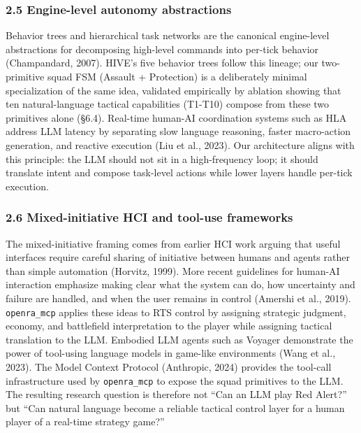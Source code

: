 \documentclass[
  journal]{IEEEtran}
\begin{document}
\subsubsection{2.5 Engine-level autonomy
abstractions}\label{engine-level-autonomy-abstractions}

Behavior trees and hierarchical task networks are the canonical
engine-level abstractions for decomposing high-level commands into
per-tick behavior (Champandard, 2007). HIVE's five behavior trees follow
this lineage; our two-primitive squad FSM (Assault + Protection) is a
deliberately minimal specialization of the same idea, validated
empirically by ablation showing that ten natural-language tactical
capabilities (T1-T10) compose from these two primitives alone (§6.4).
Real-time human-AI coordination systems such as HLA address LLM latency
by separating slow language reasoning, faster macro-action generation,
and reactive execution (Liu et al., 2023). Our architecture aligns with
this principle: the LLM should not sit in a high-frequency loop; it
should translate intent and compose task-level actions while lower
layers handle per-tick execution.

\subsubsection{2.6 Mixed-initiative HCI and tool-use
frameworks}\label{mixed-initiative-hci-and-tool-use-frameworks}

The mixed-initiative framing comes from earlier HCI work arguing that
useful interfaces require careful sharing of initiative between humans
and agents rather than simple automation (Horvitz, 1999). More recent
guidelines for human-AI interaction emphasize making clear what the
system can do, how uncertainty and failure are handled, and when the
user remains in control (Amershi et al., 2019). \texttt{openra\_mcp}
applies these ideas to RTS control by assigning strategic judgment,
economy, and battlefield interpretation to the player while assigning
tactical translation to the LLM. Embodied LLM agents such as Voyager
demonstrate the power of tool-using language models in game-like
environments (Wang et al., 2023). The Model Context Protocol (Anthropic,
2024) provides the tool-call infrastructure used by \texttt{openra\_mcp}
to expose the squad primitives to the LLM. The resulting research
question is therefore not ``Can an LLM play Red Alert?'' but ``Can
natural language become a reliable tactical control layer for a human
player of a real-time strategy game?''
\end{document}
